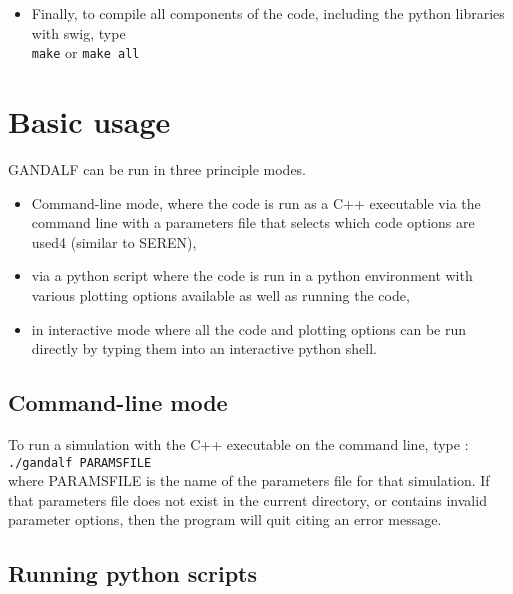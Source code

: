 \documentclass[a4paper]{article}
\newcommand{\var}[1]{\texttt{#1}}
\begin{document}
\begin{itemize}
\item Finally, to compile all components of the code, including the python libraries with swig, type \\
\newline
\noindent \var{make} or \var{make all} \\

\end{itemize}

\newpage


\section{Basic usage}
GANDALF can be run in three principle modes.  
\begin{itemize} 
\item Command-line mode, where the code is run as a C++ executable via the command line with a parameters file that selects which code options are used4 (similar to SEREN), 
\item via a python script where the code is run in a python environment with various plotting options available as well as running the code, 
\item in interactive mode where all the code and plotting options can be run directly by typing them into an interactive python shell.
\end{itemize}



\subsection{Command-line mode}

\noindent To run a simulation with the C++ executable on the command line, type : \\
\newline
\var{./gandalf PARAMSFILE} \\
\newline
where PARAMSFILE is the name of the parameters file for that simulation.  If that parameters file does not exist in the current directory, or contains invalid parameter options, then the program will quit citing an error message.



\subsection{Running python scripts}
\end{document}
